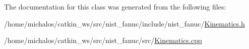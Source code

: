 The documentation for this class was generated from the following files\-:\begin{DoxyCompactItemize}
\item 
/home/michalos/catkin\-\_\-ws/src/nist\-\_\-fanuc/include/nist\-\_\-fanuc/\hyperlink{Kinematics_8h}{Kinematics.\-h}\item 
/home/michalos/catkin\-\_\-ws/src/nist\-\_\-fanuc/src/\hyperlink{Kinematics_8cpp}{Kinematics.\-cpp}\end{DoxyCompactItemize}
